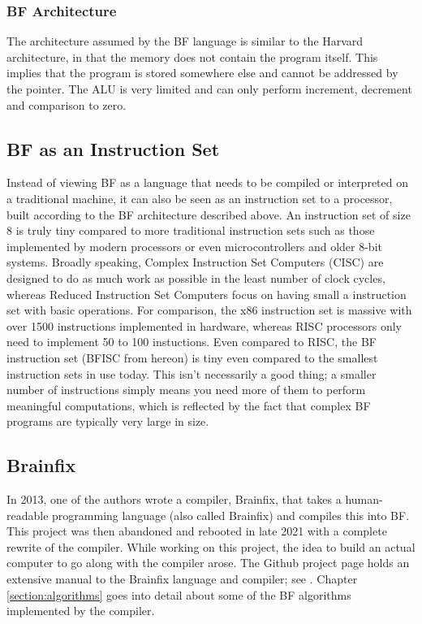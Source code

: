 \subsubsection{BF Architecture}
The architecture assumed by the BF language is similar to the Harvard architecture, in that the memory does not contain the program itself. This implies that the program is stored somewhere else and cannot be addressed by the pointer. The ALU is very limited and can only perform increment, decrement and comparison to zero.


\subsection{BF as an Instruction Set}
Instead of viewing BF as a language that needs to be compiled or interpreted on a traditional machine, it can also be seen as an instruction set to a processor, built according to the BF architecture described above. An instruction set of size 8 is truly tiny compared to more traditional instruction sets such as those implemented by modern processors or even microcontrollers and older 8-bit systems. Broadly speaking, Complex Instruction Set Computers (CISC) are designed to do as much work as possible in the least number of clock cycles, whereas Reduced Instruction Set Computers focus on having small a instruction set with basic operations. For comparison, the x86 instruction set is massive with over 1500 instructions implemented in hardware, whereas RISC processors only need to implement 50 to 100 instuctions. Even compared to RISC, the BF instruction set (BFISC from hereon) is tiny even compared to the smallest instruction sets in use today. This isn't necessarily a good thing; a smaller number of instructions simply means you need more of them to perform meaningful computations, which is reflected by the fact that complex BF programs are typically very large in size.

\subsection{Brainfix}
In 2013, one of the authors wrote a compiler, Brainfix, that takes a human-readable programming language (also called Brainfix) and compiles this into BF. This project was then abandoned and rebooted in late 2021 with a complete rewrite of the compiler. While working on this project, the idea to build an actual computer to go along with the compiler arose. The Github project page holds an extensive manual to the Brainfix language and compiler; see \cite{brainfix}. Chapter \ref{section:algorithms} goes into detail about some of the BF algorithms implemented by the compiler.
